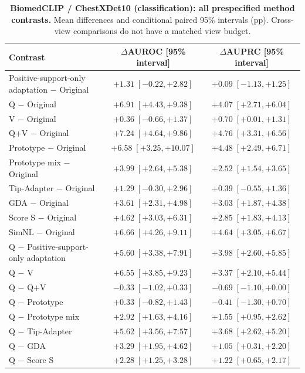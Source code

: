 \begin{table}[tp]
\centering
\caption{\textbf{BiomedCLIP / ChestXDet10 (classification): all prespecified method contrasts.} Mean differences and conditional paired 95\% intervals (pp). Cross-view comparisons do not have a matched view budget.}
\label{tab:supp-oldci-biomedclip-chestxdet10}
\footnotesize
\setlength{\tabcolsep}{4pt}
\begin{tabular*}{\textwidth}{@{\extracolsep{\fill}}lcc@{}}
\toprule
Contrast & $\Delta$AUROC [95\% interval] & $\Delta$AUPRC [95\% interval] \\
\midrule
Positive-support-only adaptation $-$ Original & $+1.31\;[-0.22,+2.82]$ & $+0.09\;[-1.13,+1.25]$ \\
Q $-$ Original & $+6.91\;[+4.43,+9.38]$ & $+4.07\;[+2.71,+6.04]$ \\
V $-$ Original & $+0.36\;[-0.66,+1.37]$ & $+0.70\;[+0.01,+1.31]$ \\
Q+V $-$ Original & $+7.24\;[+4.64,+9.86]$ & $+4.76\;[+3.31,+6.56]$ \\
Prototype $-$ Original & $+6.58\;[+3.25,+10.07]$ & $+4.48\;[+2.49,+6.71]$ \\
Prototype mix $-$ Original & $+3.99\;[+2.64,+5.38]$ & $+2.52\;[+1.54,+3.65]$ \\
Tip-Adapter $-$ Original & $+1.29\;[-0.30,+2.96]$ & $+0.39\;[-0.55,+1.36]$ \\
GDA $-$ Original & $+3.61\;[+2.31,+4.98]$ & $+3.03\;[+1.87,+4.38]$ \\
Score S $-$ Original & $+4.62\;[+3.03,+6.31]$ & $+2.85\;[+1.83,+4.13]$ \\
SimNL $-$ Original & $+6.66\;[+4.26,+9.11]$ & $+4.64\;[+3.05,+6.67]$ \\
Q $-$ Positive-support-only adaptation & $+5.60\;[+3.38,+7.91]$ & $+3.98\;[+2.60,+5.85]$ \\
Q $-$ V & $+6.55\;[+3.85,+9.23]$ & $+3.37\;[+2.10,+5.44]$ \\
Q $-$ Q+V & $-0.33\;[-1.02,+0.33]$ & $-0.69\;[-1.10,+0.00]$ \\
Q $-$ Prototype & $+0.33\;[-0.82,+1.43]$ & $-0.41\;[-1.30,+0.70]$ \\
Q $-$ Prototype mix & $+2.92\;[+1.63,+4.16]$ & $+1.55\;[+0.95,+2.62]$ \\
Q $-$ Tip-Adapter & $+5.62\;[+3.56,+7.57]$ & $+3.68\;[+2.62,+5.20]$ \\
Q $-$ GDA & $+3.29\;[+1.95,+4.62]$ & $+1.05\;[+0.31,+2.20]$ \\
Q $-$ Score S & $+2.28\;[+1.25,+3.28]$ & $+1.22\;[+0.65,+2.17]$ \\

\end{tabular*}
\end{table}
